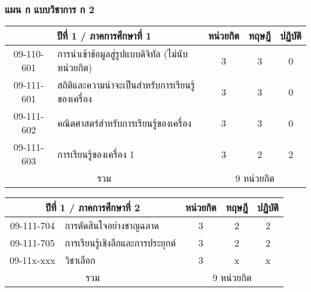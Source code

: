 \newpage
\subsubsection*{แผน ก แบบวิชาการ ก 2}

\renewcommand{\arraystretch}{1.4}
\begin{tabular}{|cp{}|ccc|}
\hline
\multicolumn{2}{|c|}{ปีที่ 1 / ภาคการศึกษาที่ 1} & \multicolumn{1}{c|}{หน่วยกิต} & \multicolumn{1}{c|}{ทฤษฎี} & \multicolumn{1}{c|}{ปฏิบัติ}  \\ \hline
\multicolumn{1}{|c|}{09-110-601}  & การนำเข้าข้อมูลสู่รูปแบบดิจิทัล (ไม่นับหน่วยกิต)  & \multicolumn{1}{c|}{3}        & \multicolumn{1}{c|}{3}     & \multicolumn{1}{c|}{0}                   \\ \hline
\multicolumn{1}{|c|}{09-111-601}  & สถิติและความน่าจะเป็นสำหรับการเรียนรู้ของเครื่อง  & \multicolumn{1}{c|}{3}        & \multicolumn{1}{c|}{3}     & \multicolumn{1}{c|}{0}                   \\ \hline
\multicolumn{1}{|c|}{09-111-602}  & คณิตศาสตร์สำหรับการเรียนรู้ของเครื่อง  & \multicolumn{1}{c|}{3}        & \multicolumn{1}{c|}{3}     & \multicolumn{1}{c|}{0}                   \\ \hline
\multicolumn{1}{|c|}{09-111-603}  & การเรียนรู้ของเครื่อง 1  & \multicolumn{1}{c|}{3}        & \multicolumn{1}{c|}{2}     & \multicolumn{1}{c|}{2}                    \\ \hline
\multicolumn{2}{|c|}{รวม}                        & \multicolumn{3}{c|}{9 หน่วยกิต}                                                                            \\ \hline
\end{tabular}

\vspace{5ex}\par\noindent
\renewcommand{\arraystretch}{1.4}
\begin{tabular}{|cp{}|ccc|}
\hline
\multicolumn{2}{|c|}{ปีที่ 1 / ภาคการศึกษาที่ 2} & \multicolumn{1}{c|}{หน่วยกิต} & \multicolumn{1}{c|}{ทฤษฎี} & \multicolumn{1}{c|}{ปฏิบัติ}  \\ \hline
\multicolumn{1}{|c|}{09-111-704}  & การตัดสินใจอย่างชาญฉลาด  & \multicolumn{1}{c|}{3}        & \multicolumn{1}{c|}{2}     & \multicolumn{1}{c|}{2}                    \\ \hline
\multicolumn{1}{|c|}{09-111-705}  & การเรียนรู้เชิงลึกและการประยุกต์  & \multicolumn{1}{c|}{3}        & \multicolumn{1}{c|}{2}     & \multicolumn{1}{c|}{2}                    \\ \hline
\multicolumn{1}{|c|}{09-11x-xxx}  & วิชาเลือก  & \multicolumn{1}{c|}{3}        & \multicolumn{1}{c|}{x}     & \multicolumn{1}{c|}{x}                   \\ \hline
\multicolumn{2}{|c|}{รวม}                        & \multicolumn{3}{c|}{9 หน่วยกิต}                                                                            \\ \hline
\end{tabular}

